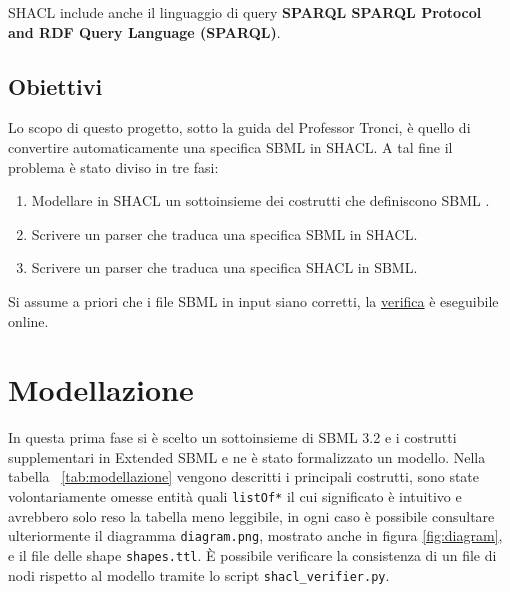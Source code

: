 \documentclass{article}
\begin{document}
SHACL include anche il linguaggio di query \textbf{SPARQL SPARQL Protocol and RDF Query Language (SPARQL)}.

\subsection{Obiettivi}

Lo scopo di questo progetto, sotto la guida del Professor Tronci, è quello di convertire automaticamente una specifica SBML in SHACL. A tal fine il problema è stato diviso in tre fasi:

\begin{enumerate}
    \item Modellare in SHACL un sottoinsieme dei costrutti che definiscono SBML . 
    \item Scrivere un parser che traduca una specifica SBML in SHACL.
    \item Scrivere un parser che traduca una specifica SHACL in SBML.
\end{enumerate}

Si assume a priori che i file SBML in input siano corretti, la \href{http://sbml.org/Facilities/Validator}{verifica} è eseguibile online.

\section{Modellazione}

In questa prima fase si è scelto un sottoinsieme di SBML 3.2 e i costrutti supplementari in Extended SBML e ne è stato formalizzato un modello. Nella tabella ~\ref{tab:modellazione} vengono descritti i principali costrutti, sono state volontariamente omesse entità quali \texttt{listOf*} il cui significato è intuitivo e avrebbero solo reso la tabella meno leggibile, in ogni caso è possibile consultare ulteriormente il diagramma \texttt{diagram.png}, mostrato anche in figura \ref{fig:diagram}, e il file delle shape \texttt{shapes.ttl}. È possibile verificare la consistenza di un file di nodi rispetto al modello tramite lo script \texttt{shacl\_verifier.py}.
\end{document}

